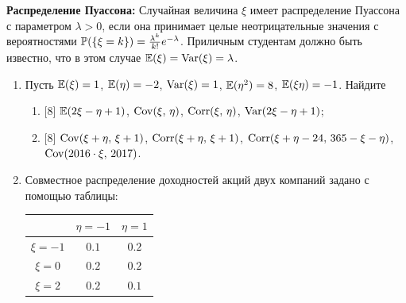\documentclass[12pt, a4paper]{article}\usepackage[]{graphicx}\usepackage[]{color}
\begin{document}
						\textbf{Распределение Пуассона:} Случайная величина $\xi$ имеет распределение Пуассона с параметром $\lambda > 0$,  если она принимает целые неотрицательные значения с вероятностями $\P(\{\xi = k\}) = \frac{\lambda^k}{k!}e^{-\lambda}$. Приличным студентам должно быть известно, что в этом случае $\E(\xi) = \Var(\xi) = \lambda$.

						\begin{enumerate}
							\item Пусть $\E(\xi) = 1$, $\E(\eta) = -2$, $\Var(\xi) = 1$, $\E(\eta^2) = 8$, $\E(\xi \eta) = -1$. Найдите
							\begin{enumerate}
								\item{} [8] $\E(2\xi-\eta+1)$, $\Cov(\xi, \,\eta)$, $\Corr(\xi, \,\eta)$,  $\Var(2\xi-\eta+1)$;
								\item{} [8] $\Cov(\xi+\eta, \,\xi+1)$, $\Corr(\xi+\eta, \,\xi+1)$, $\Corr(\xi+\eta-24, \,365 - \xi - \eta)$, $\Cov(2016\cdot\xi, \, 2017)$.
							\end{enumerate}

							\item
							Совместное распределение доходностей акций двух компаний задано с помощью таблицы:

							\begin{center}
								\begin{tabular}{c|cc}
									\toprule
									& $\eta=-1$ & $\eta=1$ \\
									\midrule
									$\xi=-1$  & $0.1$       & $0.2$   \\
									$\xi=0$   & $0.2$       & $0.2$   \\
									$\xi=2$   & $0.2$       & $0.1$   \\
									\bottomrule
								\end{tabular}
							\end{center}


\end{enumerate}
\end{document}
